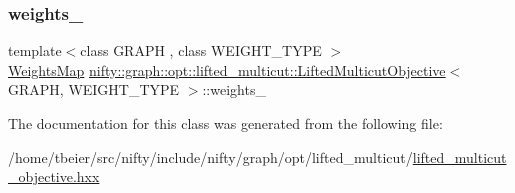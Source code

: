 \mbox{\label{classnifty_1_1graph_1_1opt_1_1lifted__multicut_1_1LiftedMulticutObjective_aa635b4852aaf328c0cca00f84c9f0fd6}} 
\subsubsection{\texorpdfstring{weights\+\_\+}{weights\_}}
{\footnotesize\ttfamily template$<$class G\+R\+A\+PH , class W\+E\+I\+G\+H\+T\+\_\+\+T\+Y\+PE $>$ \\
\hyperlink{classnifty_1_1graph_1_1opt_1_1lifted__multicut_1_1LiftedMulticutObjective_ab4bdcf27ce49303201bb4332db89a78c}{Weights\+Map} \hyperlink{classnifty_1_1graph_1_1opt_1_1lifted__multicut_1_1LiftedMulticutObjective}{nifty\+::graph\+::opt\+::lifted\+\_\+multicut\+::\+Lifted\+Multicut\+Objective}$<$ G\+R\+A\+PH, W\+E\+I\+G\+H\+T\+\_\+\+T\+Y\+PE $>$\+::weights\+\_\+\hspace{0.3cm}{\ttfamily [protected]}}



The documentation for this class was generated from the following file\+:\begin{DoxyCompactItemize}
\item 
/home/tbeier/src/nifty/include/nifty/graph/opt/lifted\+\_\+multicut/\hyperlink{graph_2opt_2lifted__multicut_2lifted__multicut__objective_8hxx}{lifted\+\_\+multicut\+\_\+objective.\+hxx}\end{DoxyCompactItemize}
